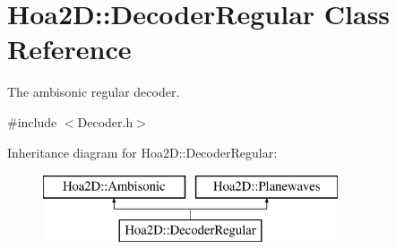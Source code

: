 \hypertarget{class_hoa2_d_1_1_decoder_regular}{\section{Hoa2\-D\-:\-:Decoder\-Regular Class Reference}
\label{class_hoa2_d_1_1_decoder_regular}
}


The ambisonic regular decoder.  




{\ttfamily \#include $<$Decoder.\-h$>$}

Inheritance diagram for Hoa2\-D\-:\-:Decoder\-Regular\-:\begin{figure}[H]
\begin{center}
\leavevmode
\includegraphics[height=2.000000cm]{class_hoa2_d_1_1_decoder_regular}
\end{center}
\end{figure}
